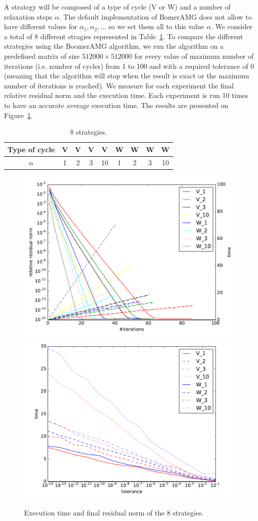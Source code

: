 \documentclass[sigplan]{acmart}
\begin{document}
A strategy will be composed of a type of cycle (V or W) and a number of relaxation steps $\alpha$. The default implementation of BomerAMG does not allow to have different values
for $\alpha_1,\alpha_2,\dots$ so we set them all to this value $\alpha$. We consider a total of 8 different stragies represented in Table~\ref{table.strat1}.
To compare the different strategies using the BoomerAMG algorithm, we run the algorithm on a predefined matrix of size $512000 \times 512000$ for every
value of maximum number of iterations (i.e. number of cycles) from 1 to 100 and with a required tolerance of $0$ (meaning
that the algorithm will stop when the result is exact or the maximum number of iterations is reached). We measure for each experiment the final relative residual norm and the execution time. Each experiment is run 10 times to have an accurate average execution time.
The results are presented on Figure~\ref{fig.first_tests}.

\begin{table}

\begin{center}
 \begin{tabular}{|c|c|c|c|c|c|c|c|c|}
   \hline
   Type of cycle & V & V & V & V & W & W & W & W \\
   \hline
   $\alpha$ & 1 & 2 & 3 & 10 & 1 & 2 & 3 & 10 \\
   \hline
 \end{tabular}
\end{center}
 \caption{8 strategies.}
 \label{table.strat1}

\end{table}


\begin{figure}
  \includegraphics[width=0.49\linewidth]{figs/convergence_1.pdf}
  \includegraphics[width=0.49\linewidth]{figs/time_convergence.pdf}
  \caption{Execution time and final residual norm of the 8 strategies.}
  \label{fig.first_tests}
\end{figure}
\end{document}
